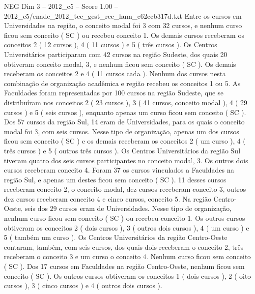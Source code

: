 \begin{textsample}{NEG Dim 3 – 2012\_c5 – Score 1.00 – 2012\_c5/enade\_2012\_tec\_gest\_rec\_hum\_c62ecb317d.txt}
Entre os cursos em Universidades na região, o conceito modal foi 3 com 32 cursos, e nenhum curso ficou sem conceito ( SC ) ou recebeu conceito 1.
Os demais cursos receberam os conceitos 2 ( 12 cursos ), 4 ( 11 cursos ) e 5 ( três cursos ).
Os Centros Universitários participaram com 42 cursos na região Sudeste, dos quais 20 obtiveram conceito modal, 3, e nenhum ficou sem conceito ( SC ).
Os demais receberam os conceitos 2 e 4 ( 11 cursos cada ).
Nenhum dos cursos nesta combinação de organização acadêmica e região recebeu os conceitos 1 ou 5.
As Faculdades foram representadas por 100 cursos na região Sudeste, que se distribuíram nos conceitos 2 ( 23 cursos ), 3 ( 41 cursos, conceito modal ), 4 ( 29 cursos ) e 5 ( seis cursos ), enquanto apenas um curso ficou sem conceito ( SC ).
Dos 57 cursos da região Sul, 14 eram de Universidades, para os quais o conceito modal foi 3, com seis cursos.
Nesse tipo de organização, apenas um dos cursos ficou sem conceito ( SC ) e os demais receberam os conceitos 2 ( um curso ), 4 ( três cursos ) e 5 ( outros três cursos ).
Os Centros Universitários da região Sul tiveram quatro dos seis cursos participantes no conceito modal, 3.
Os outros dois cursos receberam conceito 4.
Foram 37 os cursos vinculados a Faculdades na região Sul, e apenas um destes ficou sem conceito ( SC ). 11 desses cursos receberam conceito 2, o conceito modal, dez cursos receberam conceito 3, outros dez cursos receberam conceito 4 e cinco cursos, conceito 5.
Na região Centro-Oeste, seis dos 29 cursos eram de Universidades.
Nesse tipo de organização, nenhum curso ficou sem conceito ( SC ) ou recebeu conceito 1.
Os outros cursos obtiveram os conceitos 2 ( dois cursos ), 3 ( outros dois cursos ), 4 ( um curso ) e 5 ( também um curso ).
Os Centros Universitários da região Centro-Oeste contaram, também, com seis cursos, dos quais dois receberam o conceito 2, três receberam o conceito 3 e um curso o conceito 4.
Nenhum curso ficou sem conceito ( SC ).
Dos 17 cursos em Faculdades na região Centro-Oeste, nenhum ficou sem conceito ( SC ).
Os outros cursos obtiveram os conceitos 1 ( dois cursos ), 2 ( oito cursos ), 3 ( cinco cursos ) e 4 ( outros dois cursos ).

\end{textsample}
